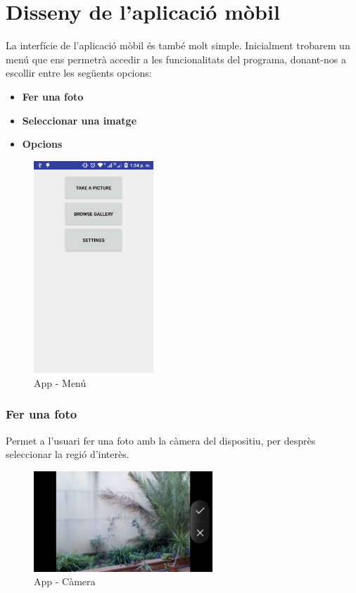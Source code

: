\section{Disseny de l'aplicació mòbil}
	La interfície de l'aplicació mòbil és també molt simple. Inicialment trobarem un menú que ens permetrà accedir a les funcionalitats del programa, donant-nos a escollir entre les següents opcions:
	\begin{itemize}
		\item{\textbf{Fer una foto}}
		\item{\textbf{Seleccionar una imatge}}
		\item{\textbf{Opcions}}
	\end{itemize}
	\begin{figure}[H]
		\centering
		\includegraphics[width=0.4\textwidth]{images/menu}
		\caption{App - Menú}
	\end{figure}
	\subsubsection{Fer una foto}
		Permet a l'usuari fer una foto amb la càmera del dispositiu, per desprès seleccionar la regió d'interès.\\
		\begin{figure}[H]
			\centering
			\includegraphics[width=0.6\textwidth]{images/cam}
			\caption{App - Càmera}
		\end{figure}
